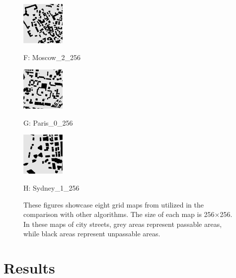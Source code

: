 \documentclass[letterpaper, 10 pt, journal, twoside]{IEEEtran}
\begin{document}
\begin{figure}[t]
\hfill
\begin{minipage}{.24\linewidth}
  \centerline{\includegraphics[width=2.1cm]{Moscow_2_256.png}}
  \centerline{F: Moscow\_2\_256}
\end{minipage}
\hfill
\begin{minipage}{.24\linewidth}
  \centerline{\includegraphics[width=2.1cm]{Paris_0_256.png}}
  \centerline{G: Paris\_0\_256}
\end{minipage}
\hfill
\begin{minipage}{.24\linewidth}
  \centerline{\includegraphics[width=2.1cm]{Sydney_1_256.png}}
  \centerline{H: Sydney\_1\_256}
\end{minipage}
\vfill

\caption{These figures showcase eight grid maps from \cite{sturtevant2012benchmarks} utilized in the comparison with other algorithms. The size of each map is 256$\times$256. In these maps of city streets, grey areas represent passable areas, while black areas represent unpassable areas. }
\label{city_maps}
\end{figure}

\section{Results}
\label{Results}
\end{document}

